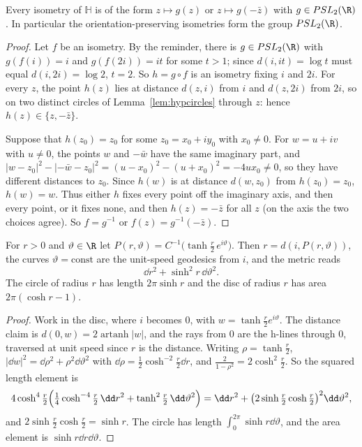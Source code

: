 \begin{theorem}\label{thm:isometries}
Every isometry of $\mathbb H$ is of the form $z\mapsto g(z)$ or $z\mapsto g(-\bar z)$ with $g\in PSL_2(\R)$. In particular the orientation-preserving isometries form the group $PSL_2(\R)$.
\end{theorem}

\begin{proof}
Let $f$ be an isometry. By the reminder, there is $g\in PSL_2(\R)$ with $g(f(i))=i$ and $g(f(2i))=it$ for some $t>1$; since $d(i,it)=\log t$ must equal $d(i,2i)=\log2$, $t=2$. So $h=g\circ f$ is
an isometry fixing $i$ and $2i$. For every $z$, the point $h(z)$ lies at distance $d(z,i)$ from $i$ and $d(z,2i)$ from $2i$, so on two distinct circles of Lemma~\ref{lem:hypcircles} through $z$:
hence $h(z)\in\{z,-\bar z\}$.

Suppose that $h(z_0)=z_0$ for some $z_0=x_0+iy_0$ with $x_0\ne0$. For $w=u+iv$ with $u\neq0$, the points $w$ and $-\bar w$ have the same imaginary part, and
$|w-z_0|^2-|-\bar w-z_0|^2=(u-x_0)^2-(u+x_0)^2=-4ux_0\neq0$, so they have different distances to $z_0$. Since $h(w)$ is at distance $d(w,z_0)$ from $h(z_0)=z_0$, $h(w)=w$. Thus either $h$ fixes
every point off the imaginary axis, and then every point, or it fixes none, and then $h(z)=-\bar z$ for all $z$ (on the axis the two choices agree). So $f=g^{-1}$ or $f(z)=g^{-1}(-\bar z)$.
\end{proof}

\begin{proposition}\label{prop:hyppolar}
For $r>0$ and $\vartheta\in\R$ let $P(r,\vartheta)=C^{-1}\bigl(\tanh\frac r2\,e^{i\vartheta}\bigr)$. Then $r=d(i,P(r,\vartheta))$, the curves $\vartheta=\mathrm{const}$ are the unit-speed geodesics from $i$, and the metric reads
\[\dd r^2+\sinh^2r\,\dd\vartheta^2.\]
The circle of radius $r$ has length $2\pi\sinh r$ and the disc of radius $r$ has area $2\pi(\cosh r-1)$.
\end{proposition}

\begin{proof}
Work in the disc, where $i$ becomes $0$, with $w=\tanh\frac r2e^{i\vartheta}$. The distance claim is $d(0,w)=2\operatorname{artanh}|w|$, and the rays from $0$ are the h-lines through $0$, traversed
at unit speed since $r$ is the distance. Writing $\rho=\tanh\frac r2$, $|\dd w|^2=\dd\rho^2+\rho^2\dd\vartheta^2$ with $\dd\rho=\frac12\cosh^{-2}\frac r2\dd r$, and $\frac2{1-\rho^2}=2\cosh^2\frac r2$. So the squared length
element is
\[4\cosh^4\tfrac r2\Bigl(\tfrac14\cosh^{-4}\tfrac r2\,\dd r^2+\tanh^2\tfrac r2\,\dd\vartheta^2\Bigr)=\dd r^2+\bigl(2\sinh\tfrac r2\cosh\tfrac r2\bigr)^2\dd\vartheta^2,\]
and $2\sinh\frac r2\cosh\frac r2=\sinh r$. The circle has length $\int_0^{2\pi}\sinh r\dd\vartheta$, and the area element is $\sinh r\dd r\dd\vartheta$.
\end{proof}

